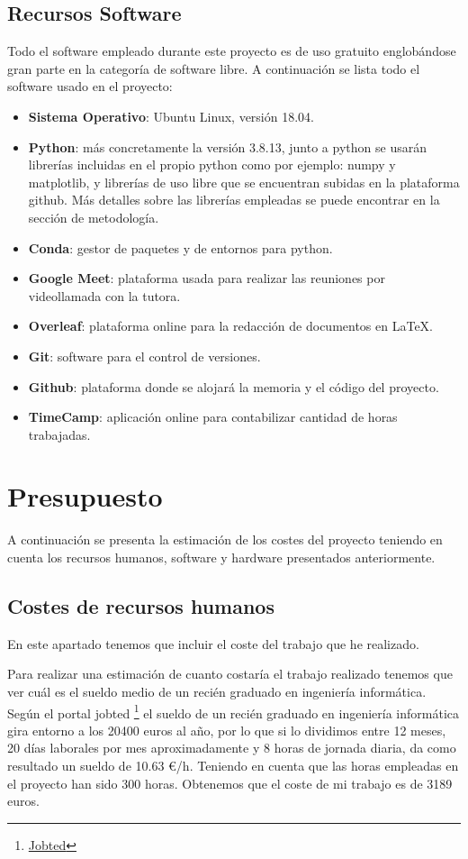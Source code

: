 \subsection{Recursos Software}
Todo el software empleado durante este proyecto es de uso gratuito englobándose gran parte en la categoría de software libre. A continuación se lista todo el software usado en el proyecto:

\begin{itemize}
    \item \textbf{Sistema Operativo}: Ubuntu Linux, versión 18.04.
    \item \textbf{Python}: más concretamente la versión 3.8.13, junto a python se usarán librerías incluidas en el propio python como por ejemplo: numpy y matplotlib, y librerías de uso libre que se encuentran subidas en la plataforma github. Más detalles sobre las librerías empleadas se puede encontrar en la sección de metodología.
    \item \textbf{Conda}: gestor de paquetes y de entornos para python.
    \item \textbf{Google Meet}: plataforma usada para realizar las reuniones por videollamada con la tutora.
    \item \textbf{Overleaf}: plataforma online para la redacción de documentos en \LaTeX.
    \item \textbf{Git}: software para el control de versiones. 
    \item \textbf{Github}: plataforma donde se alojará la memoria y el código del proyecto.
    \item \textbf{TimeCamp}: aplicación online para contabilizar cantidad de horas trabajadas.
\end{itemize}

\section{Presupuesto}
A continuación se presenta la estimación de los costes del proyecto teniendo en cuenta los recursos humanos, software y hardware presentados anteriormente. 

\subsection{Costes de recursos humanos}
En este apartado tenemos que incluir el coste del trabajo que he realizado.

Para realizar una estimación de cuanto costaría el trabajo realizado tenemos que ver cuál es el sueldo medio de un recién graduado en ingeniería informática. Según el portal jobted \footnote{\href{https://www.jobted.es/salario/ingeniero-informático}{Jobted}} el sueldo de un recién graduado en ingeniería informática gira entorno a los 20400 euros al año, por lo que si lo dividimos entre 12 meses, 20 días laborales por mes aproximadamente y 8 horas de jornada diaria, da como resultado un sueldo de 10.63 €/h. Teniendo en cuenta que las horas empleadas en el proyecto han sido 300 horas. Obtenemos que el coste de mi trabajo es de 3189 euros.


